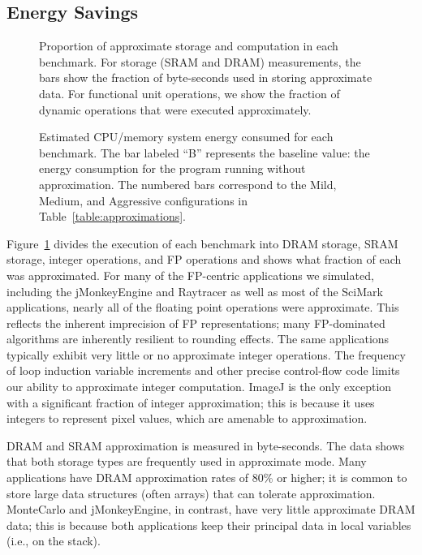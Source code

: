 \subsection{Energy Savings}

\begin{figure}

\vspace{-4ex} %
\caption{Proportion of approximate storage and computation in each benchmark.
For storage (SRAM and DRAM) measurements, the bars
show the fraction of byte-seconds used in storing approximate data.
For functional unit operations, we show the fraction of dynamic operations
that were executed approximately.}
\label{fig:approximateness}
\end{figure}

\begin{figure}

\vspace{-4ex} %
\caption{Estimated CPU/memory system energy consumed for
each benchmark. The bar labeled ``B'' represents the baseline value:
the energy consumption for the program running without approximation.
The numbered bars correspond to the Mild, Medium, and Aggressive
configurations in Table~\ref{table:approximations}.}
\label{fig:energy}
\end{figure}

Figure~\ref{fig:approximateness} divides the execution of each
benchmark into DRAM storage, SRAM storage, integer operations, and FP
operations and shows what fraction of each was approximated. For
many of the FP-centric applications we simulated, including the
jMonkeyEngine and Raytracer as well as most of the SciMark
applications, nearly all of the floating point operations were
approximate. This reflects the inherent imprecision of FP
representations; many FP-dominated algorithms are inherently resilient
to rounding effects.
The same applications typically exhibit very little or no
approximate integer operations. The frequency of loop induction
variable increments and other precise control-flow code limits our
ability to approximate integer computation. ImageJ is the only
exception with a significant fraction of integer approximation; this is
because it uses integers to represent pixel values, which are amenable
to approximation.

DRAM and SRAM approximation is measured in byte-seconds.
The data shows that
both storage types are frequently used in approximate
mode. Many applications have DRAM approximation rates
of 80\% or higher; it is common to store large data
structures (often arrays) that can tolerate approximation. MonteCarlo and
jMonkeyEngine, in contrast, have very little approximate DRAM data;
this is because both applications keep their principal data in local
variables (i.e., on the stack).

